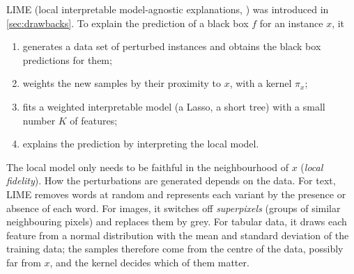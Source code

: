 LIME (local interpretable model-agnostic explanations, \citealp{ribeiro2016should}) was introduced in
\cref{sec:drawbacks}. To explain the prediction of a black box $f$ for an instance $x$, it
\begin{enumerate}
  \item generates a data set of perturbed instances and obtains the black box predictions for them;
  \item weights the new samples by their proximity to $x$, with a kernel $\pi_x$;
  \item fits a weighted interpretable model (a Lasso, a short tree) with a small number $K$ of features;
  \item explains the prediction by interpreting the local model.
\end{enumerate}
The local model only needs to be faithful in the neighbourhood of $x$ (\emph{local fidelity}).
How the perturbations are generated depends on the data. For text, LIME removes words at random and
represents each variant by the presence or absence of each word. For images, it switches off
\emph{superpixels} (groups of similar neighbouring pixels) and replaces them by grey. For tabular data,
it draws each feature from a normal distribution with the mean and standard deviation of the training
data; the samples therefore come from the centre of the data, possibly far from $x$, and the kernel decides
which of them matter.

